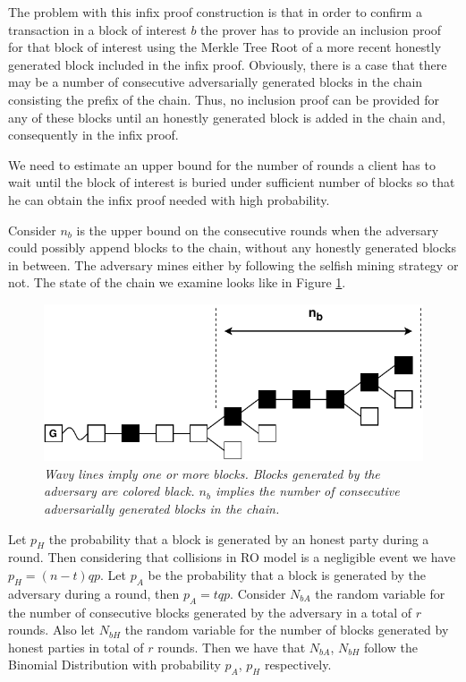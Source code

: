 \documentclass[10pt,a4paper]{article}
\theoremstyle{plain}
\theoremstyle{definition}
\begin{document}
The problem with this infix proof construction is that in order to confirm a
transaction in a block of interest $b$ the prover has to provide an inclusion
proof for that block of interest using the Merkle Tree Root of a more recent
honestly generated block included in the infix proof. Obviously, there is a case
that there may be a number of consecutive adversarially generated blocks in the
chain   consisting the prefix of the chain. Thus, no inclusion proof can be provided
for any of these blocks until an honestly generated block is added in the chain and,
consequently in the infix proof.

We need to estimate an upper bound for the number of rounds a client has to
wait until the block of interest is buried under sufficient number of blocks
so that he can obtain the infix proof needed with high probability.

Consider $n_b$ is the upper bound on the consecutive rounds when the adversary could
possibly append blocks to the chain, without any honestly generated blocks in
between. The adversary mines either by following the selfish mining strategy or
not. The state of the chain we examine looks like in Figure \ref{fig:infix_delay}.

\begin{figure}[h!]
	\begin{center}
		\includegraphics[scale=0.75]{figures/infix_delay.pdf}
	\end{center}
	\caption{\textit{Wavy lines imply one or more blocks. Blocks generated by the
	 adversary are colored black. \textbf{$n_b$} implies the number of consecutive
	 adversarially generated blocks in the chain.}}
	\label{fig:infix_delay}
\end{figure}

Let $p_H$ the probability that a block is generated by an honest party during a round.
Then considering that collisions in RO model is a negligible event we have
$p_H = (n-t)qp$. Let $p_A$ be the probability that a block is generated by the
adversary during a round, then $p_A = tqp$. Consider $N_{bA}$ the random variable
for the number of consecutive blocks generated by the adversary in a total of $r$
rounds. Also let $N_{bH}$ the random variable for the number of blocks generated by
honest parties in total of $r$ rounds. 
Then we have that $N_{bA}$, $N_{bH}$ follow the Binomial Distribution with
probability $p_A$, $p_H$ respectively.
\end{document}
